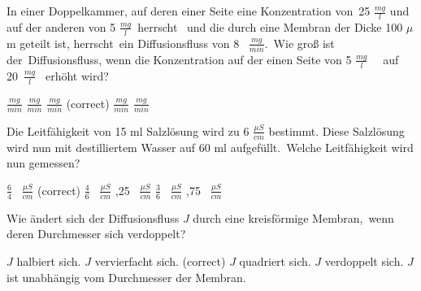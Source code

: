 \documentclass[11pt]{exam}
\begin{document}
\setlength{\voffset}{-0.5in}
\setlength{\headsep}{5pt}

\hspace{2mm}
 \hspace{5mm}
\vspace{4mm}

\begin{questions}

\question In einer Doppelkammer, auf deren einer Seite eine Konzentration von 25 \(\frac{mg}{l} \) und auf der anderen von 5 \(  \frac{mg}{l} \) herrscht  und die durch eine Membran der Dicke 100 \(\mu \)m geteilt ist, herrscht ein Diffusionsfluss von 8  \( \frac{mg}{min}\). Wie groß ist der Diffusionsfluss, wenn die Konzentration auf der einen Seite von 5 \(  \frac{mg}{l} \)   auf 20 \(  \frac{mg}{l} \)  erhöht wird?

\begin{choices}
	 \( \frac{mg}{min} \)
	 \( \frac{mg}{min} \)
	 \( \frac{mg}{min} \) (correct)
	 \( \frac{mg}{min} \)
	 \( \frac{mg}{min} \)
\end{choices}

\vspace{3mm}\question Die Leitfähigkeit von 15 ml Salzlösung wird zu 6 \( \frac{\mu S}{cm} \) bestimmt. Diese Salzlösung wird nun mit destilliertem Wasser auf 60 ml aufgefüllt. Welche Leitfähigkeit wird nun gemessen?

\begin{choices}
	\choice \( \frac{6}{4} \)  \( \frac{\mu S}{cm} \) (correct)
	\choice \( \frac{4}{6} \)  \( \frac{\mu S}{cm} \)
	,25  \( \frac{\mu S}{cm} \)
	\choice \( \frac{3}{6} \)  \( \frac{\mu S}{cm} \)
	,75  \( \frac{\mu S}{cm} \)
\end{choices}

\vspace{3mm}\question Wie ändert sich der Diffusionsfluss \( J \) durch eine kreisförmige Membran, wenn deren Durchmesser sich verdoppelt?

\begin{choices}
	\choice \( J \) halbiert sich.
	\choice \( J \) vervierfacht sich. (correct)
	\choice \( J \) quadriert sich.
	\choice \( J \) verdoppelt sich.
	\choice \( J \) ist unabhängig vom Durchmesser der Membran.
\end{choices}


\end{questions}
\end{document}
